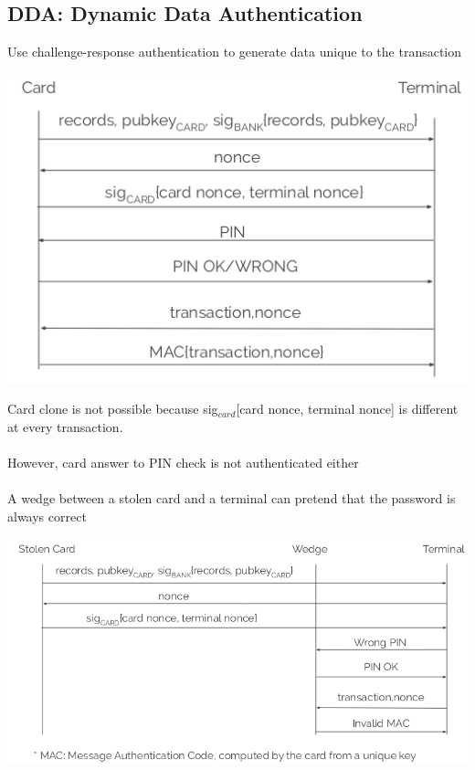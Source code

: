 \documentclass{article}[18pt]
\begin{document}
\subsection{DDA: Dynamic Data Authentication}
Use challenge-response authentication to generate data unique to the transaction
\begin{center}
	\includegraphics[scale=0.7]{dd}
\end{center}
Card clone is not possible because sig$_{card}$[card nonce, terminal nonce] is different at every transaction.\\
\\
However, card answer to PIN check is not authenticated either\\
\\
A wedge between a stolen card and a terminal can pretend that the password is always correct
\begin{center}
	\includegraphics[scale=0.7]{DDA2}
\end{center}
\end{document}
